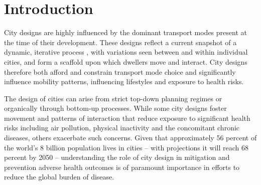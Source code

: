 \documentclass[preprint,12pt]{elsarticle}
\begin{document}
\begin{frontmatter}









\end{frontmatter}



\section*{Introduction}

City designs are highly influenced by the dominant transport modes present at the time of their development\cite{KNOWLES2020102607}. These designs reflect a current snapshot of a dynamic, iterative process \cite{Strano2012}, with variations seen between and within individual cities, and form a scaffold upon which dwellers move and interact\cite{Thompson2020}. City designs therefore both afford and constrain transport mode choice and significantly influence mobility patterns, influencing lifestyles and exposure to health risks\cite{WHO2023}.

The design of cities can arise from strict top-down planning regimes\cite{mundigo1977city} or organically through bottom-up processes\cite{batty2017thinking}. While some city designs foster movement and patterns of interaction that reduce exposure to significant health risks including air pollution, physical inactivity and the concomitant chronic diseases, others exacerbate such concerns\cite{Wijnands2022, Stevenson2016,wang2023flood, stanley2022managing}. Given that approximately 56 percent of the world's 8 billion population lives in cities -- with projections it will reach 68 percent by 2050\cite{WHO2023}  -- understanding the role of city design in mitigation and prevention adverse health outcomes is of paramount importance in efforts to reduce the global burden of disease. 
\end{document}
